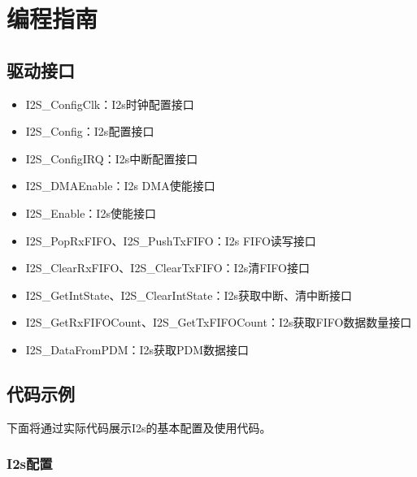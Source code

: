 \documentclass[
  12pt,
]{book}
\begin{document}
\hypertarget{ux7f16ux7a0bux6307ux5357-1}{%
\section{编程指南}\label{ux7f16ux7a0bux6307ux5357-1}}

\hypertarget{ux9a71ux52a8ux63a5ux53e3-1}{%
\subsection{驱动接口}\label{ux9a71ux52a8ux63a5ux53e3-1}}

\begin{itemize}
\item
  I2S\_ConfigClk：I2s时钟配置接口
\item
  I2S\_Config：I2s配置接口
\item
  I2S\_ConfigIRQ：I2s中断配置接口
\item
  I2S\_DMAEnable：I2s DMA使能接口
\item
  I2S\_Enable：I2s使能接口
\item
  I2S\_PopRxFIFO、I2S\_PushTxFIFO：I2s FIFO读写接口
\item
  I2S\_ClearRxFIFO、I2S\_ClearTxFIFO：I2s清FIFO接口
\item
  I2S\_GetIntState、I2S\_ClearIntState：I2s获取中断、清中断接口
\item
  I2S\_GetRxFIFOCount、I2S\_GetTxFIFOCount：I2s获取FIFO数据数量接口
\item
  I2S\_DataFromPDM：I2s获取PDM数据接口
\end{itemize}

\hypertarget{ux4ee3ux7801ux793aux4f8b-1}{%
\subsection{代码示例}\label{ux4ee3ux7801ux793aux4f8b-1}}

下面将通过实际代码展示I2s的基本配置及使用代码。

\hypertarget{i2sux914dux7f6e}{%
\subsubsection{I2s配置}\label{i2sux914dux7f6e}}
\end{document}

